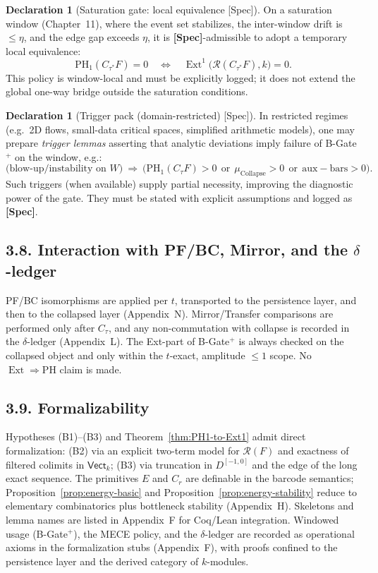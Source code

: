 \documentclass[11pt]{article}
\numberwithin{equation}{section}
\theoremstyle{plain}
\theoremstyle{definition}
\theoremstyle{remark}
\DeclareMathOperator{\Ext}{Ext}
\theoremstyle{plain}
\theoremstyle{definition}
\numberwithin{equation}{section}
\theoremstyle{definition}
\newtheorem{declaration}[theorem]{Declaration}
\numberwithin{equation}{section}
\theoremstyle{plain}
\theoremstyle{definition}
\theoremstyle{remark}
\begin{document}
\begin{declaration}[Saturation gate: local equivalence \textup{[Spec]}]\label{dec:saturation-local}
On a saturation window (Chapter~11), where the event set stabilizes, the inter-window drift is \(\le\eta\), and the edge gap exceeds \(\eta\), it is \textbf{[Spec]}-admissible to adopt a temporary local equivalence:
\[
\mathrm{PH}_1(C_{\tau^\ast}F)=0\quad\Longleftrightarrow\quad \Ext^1\!\big(\mathcal{R}(C_{\tau^\ast}F),k\big)=0.
\]
This policy is window-local and must be explicitly logged; it does not extend the global one-way bridge outside the saturation conditions.
\end{declaration}

\begin{declaration}[Trigger pack (domain-restricted) \textup{[Spec]}]\label{dec:trigger-pack}
In restricted regimes (e.g.\ 2D flows, small-data critical spaces, simplified arithmetic models), one may prepare \emph{trigger lemmas} asserting that analytic deviations imply failure of B-Gate\(^{+}\) on the window, e.g.:
\[
\text{(blow-up/instability on \(W\))}\ \Rightarrow\ \bigl(\mathrm{PH}_1(C_\tau F)>0\ \ \text{or}\ \ \mu_{\mathrm{Collapse}}>0\ \ \text{or}\ \ \mathrm{aux\!-\!bars}>0\bigr).
\]
Such triggers (when available) supply partial necessity, improving the diagnostic power of the gate. They must be stated with explicit assumptions and logged as \textbf{[Spec]}.
\end{declaration}

\subsection*{3.8. Interaction with PF/BC, Mirror, and the \texorpdfstring{$\delta$}{delta}-ledger}
PF/BC isomorphisms are applied per \(t\), transported to the persistence layer, and then to the collapsed layer (Appendix~N).
Mirror/Transfer comparisons are performed only after \(C_\tau\), and any non-commutation with collapse is recorded in the \(\delta\)-ledger (Appendix~L).
The Ext-part of B-Gate\(^{+}\) is always checked on the collapsed object and only within the \(t\)-exact, amplitude \(\le 1\) scope. No \(\Ext\Rightarrow\mathrm{PH}\) claim is made.

\subsection*{3.9. Formalizability}
Hypotheses \textup{(B1)}–\textup{(B3)} and Theorem~\ref{thm:PH1-to-Ext1} admit direct formalization: \textup{(B2)} via an explicit two-term model for \(\mathcal{R}(F)\) and exactness of filtered colimits in \(\mathsf{Vect}_k\); \textup{(B3)} via truncation in \(D^{[-1,0]}\) and the edge of the long exact sequence. The primitives \(E\) and \(C_r\) are definable in the barcode semantics; Proposition~\ref{prop:energy-basic} and Proposition~\ref{prop:energy-stability} reduce to elementary combinatorics plus bottleneck stability (Appendix~H). Skeletons and lemma names are listed in Appendix~F for Coq/Lean integration. Windowed usage (B-Gate\(^{+}\)), the MECE policy, and the \(\delta\)-ledger are recorded as operational axioms in the formalization stubs (Appendix~F), with proofs confined to the persistence layer and the derived category of \(k\)-modules.
\end{document}
